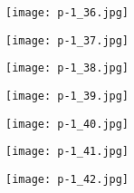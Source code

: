 \clearpage


\begin{figure}
    \begin{center}
        \texttt{[image: p-1\_36.jpg]}
        \caption{}
    \end{center}
\end{figure}

\clearpage


\begin{figure}
    \begin{center}
        \texttt{[image: p-1\_37.jpg]}
        \caption{}
    \end{center}
\end{figure}

\clearpage


\begin{figure}
    \begin{center}
        \texttt{[image: p-1\_38.jpg]}
        \caption{}
    \end{center}
\end{figure}

\clearpage


\begin{figure}
    \begin{center}
        \texttt{[image: p-1\_39.jpg]}
        \caption{}
    \end{center}
\end{figure}

\clearpage


\begin{figure}
    \begin{center}
        \texttt{[image: p-1\_40.jpg]}
        \caption{}
    \end{center}
\end{figure}

\clearpage


\begin{figure}
    \begin{center}
        \texttt{[image: p-1\_41.jpg]}
        \caption{}
    \end{center}
\end{figure}

\clearpage


\begin{figure}
    \begin{center}
        \texttt{[image: p-1\_42.jpg]}
        \caption{}
    \end{center}
\end{figure}

